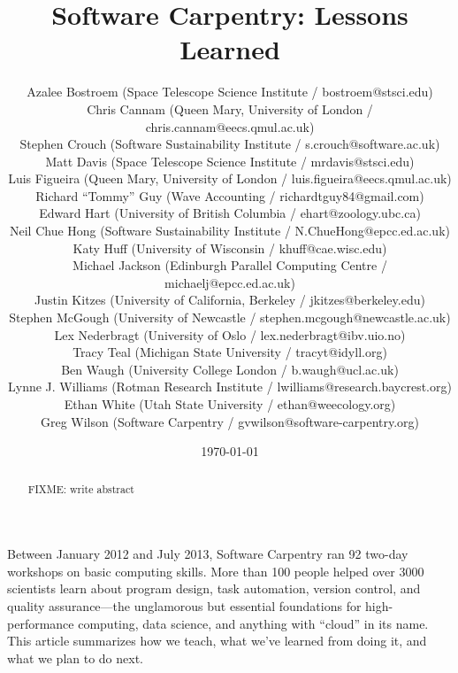 \documentclass{article}
\begin{document}
\title{Software Carpentry: Lessons Learned}
\date{\today}

\author{
  Azalee Bostroem (Space Telescope Science Institute / bostroem@stsci.edu)\\
  Chris Cannam (Queen Mary, University of London / chris.cannam@eecs.qmul.ac.uk)\\
  Stephen Crouch (Software Sustainability Institute / s.crouch@software.ac.uk)\\
  Matt Davis (Space Telescope Science Institute / mrdavis@stsci.edu)\\
  Luis Figueira (Queen Mary, University of London / luis.figueira@eecs.qmul.ac.uk)\\
  Richard ``Tommy'' Guy (Wave Accounting / richardtguy84@gmail.com)\\
  Edward Hart (University of British Columbia / ehart@zoology.ubc.ca)\\
  Neil Chue Hong (Software Sustainability Institute / N.ChueHong@epcc.ed.ac.uk)\\
  Katy Huff (University of  Wisconsin / khuff@cae.wisc.edu)\\
  Michael Jackson (Edinburgh Parallel Computing Centre / michaelj@epcc.ed.ac.uk)\\
  Justin Kitzes (University of California, Berkeley / jkitzes@berkeley.edu)\\
  Stephen McGough (University of Newcastle / stephen.mcgough@newcastle.ac.uk) \\
  Lex Nederbragt (University of Oslo / lex.nederbragt@ibv.uio.no)\\
  Tracy Teal (Michigan State University / tracyt@idyll.org)\\
  Ben Waugh (University College London / b.waugh@ucl.ac.uk)\\
  Lynne J. Williams (Rotman Research Institute / lwilliams@research.baycrest.org)\\
  Ethan White (Utah State University / ethan@weecology.org)\\
  Greg Wilson (Software Carpentry / gvwilson@software-carpentry.org)
}

\maketitle

\begin{abstract}
FIXME: write abstract
\end{abstract}

Between January 2012 and July 2013,
Software Carpentry ran 92 two-day workshops on basic computing skills.
More than 100 people helped over 3000 scientists learn about
program design,
task automation,
version control,
and quality assurance---the unglamorous but essential foundations
for high-performance computing,
data science,
and anything with ``cloud'' in its name.
This article summarizes how we teach,
what we've learned from doing it,
and what we plan to do next.
\end{document}
